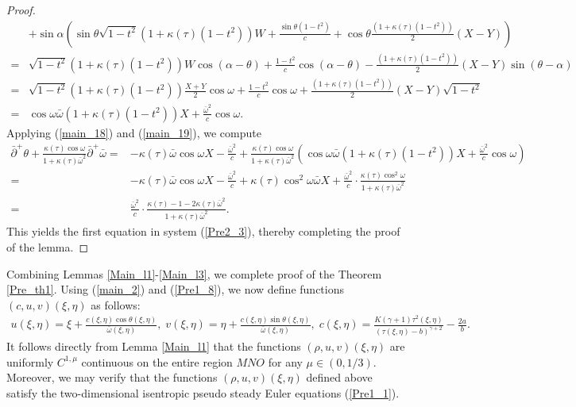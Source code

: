 \documentclass[3p,11pt]{elsarticle}
\numberwithin{equation}{section}
\begin{document}
\begin{proof}
\begin{equation}
\begin{split}
           &+\sin\alpha \left(\sin\theta\sqrt{1-t^2}(1+\kappa(\tau)(1-t^2)){W}+\frac{\sin\theta(1-t^2)}{c}+\cos\theta\frac{(1+\kappa(\tau)(1-t^2))}{2}(  X- Y) \right)\\
           =& \sqrt{1-t^2} (1+\kappa(\tau)(1-t^2)){W}\cos(\alpha-\theta)+\frac{1-t^2}{c}\cos(\alpha-\theta)-\frac{(1+\kappa(\tau)(1-t^2))}{2}(  X- Y)\sin(\theta-\alpha)\\
           =&\sqrt{1-t^2} (1+\kappa(\tau)(1-t^2))\frac{ X+ Y}{2}\cos\omega+\frac{1-t^2}{c}\cos\omega+\frac{(1+\kappa(\tau)(1-t^2))}{2}(  X- Y)\sqrt{1-t^2}\\
           =& \cos\omega\bar\omega (1+\kappa(\tau)(1-t^2)) X+\frac{\bar\omega^2}{c}\cos\omega.
        \end{split}
    \end{equation}
    Applying (\ref{main_18}) and (\ref{main_19}), we compute
    \begin{equation*}\label{main_20}
        \begin{split}
            \bar\partial^+ \theta + \frac{\kappa(\tau)\cos\omega}{1+\kappa(\tau)\bar\omega^2}\bar \partial^+\bar\omega =& - \kappa(\tau)\bar\omega\cos\omega X-\frac{\bar\omega^2}{c} + \frac{\kappa(\tau)\cos\omega}{1+\kappa(\tau)\bar\omega^2}\left( \cos\omega\bar\omega (1+\kappa(\tau)(1-t^2)) X+\frac{\bar\omega^2}{c}\cos\omega\right)\\
            =& - \kappa(\tau)\bar\omega\cos\omega X-\frac{\bar\omega^2}{c} + \kappa(\tau)\cos^2\omega\bar\omega X+\frac{\bar\omega^2}{c}\cdot \frac{\kappa(\tau)\cos^2\omega}{1+\kappa(\tau)\bar\omega^2}\\
            =& \frac{\bar\omega^2}{c}\cdot \frac{\kappa(\tau)-1-2\kappa(\tau)\bar\omega^2}{1+\kappa(\tau)\bar\omega^2}.
        \end{split}
    \end{equation*}
    This yields the first equation in system (\ref{Pre2_3}), thereby completing the proof of the lemma.
\end{proof}
Combining Lemmas \ref{Main_l1}-\ref{Main_l3}, we complete proof of the Theorem \ref{Pre_th1}. Using (\ref{main_2}) and (\ref{Pre1_8}), we now define functions $(c,u,v)(\xi,\eta)$ as follows:
\begin{equation*}\label{main_21}
    \begin{split}
        u(\xi,\eta)=\xi+\frac{c(\xi,\eta)\cos\theta(\xi,\eta)}{\bar\omega(\xi,\eta)},\; v(\xi,\eta)=\eta+\frac{c(\xi,\eta)\sin\theta(\xi,\eta)}{\bar\omega(\xi,\eta)},\; c(\xi,\eta)=\frac{K(\gamma+1)\tau^2(\xi,\eta)}{(\tau(\xi,\eta)-b)^{\gamma+2}}-\frac{2a}{b}.
    \end{split}
\end{equation*}
It follows directly from Lemma \ref{Main_l1} that the functions $(\rho,u,v)(\xi,\eta)$ are uniformly $C^{1,\mu}$ continuous on the entire region $MNO$ for any $\mu\in(0,1/3)$. Moreover, we may verify that the functions $(\rho,u,v)(\xi,\eta)$ defined above satisfy the two-dimensional isentropic pseudo steady Euler equations (\ref{Pre1_1}). %
\end{document}
